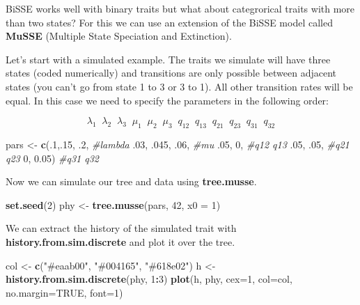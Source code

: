 \documentclass[
]{book}
\newenvironment{Shaded}{\begin{snugshade}}{\end{snugshade}}
\newcommand{\CommentTok}[1]{\textcolor[rgb]{0.56,0.35,0.01}{\textit{#1}}}
\newcommand{\DataTypeTok}[1]{\textcolor[rgb]{0.13,0.29,0.53}{#1}}
\newcommand{\DecValTok}[1]{\textcolor[rgb]{0.00,0.00,0.81}{#1}}
\newcommand{\FloatTok}[1]{\textcolor[rgb]{0.00,0.00,0.81}{#1}}
\newcommand{\KeywordTok}[1]{\textcolor[rgb]{0.13,0.29,0.53}{\textbf{#1}}}
\newcommand{\NormalTok}[1]{#1}
\newcommand{\OperatorTok}[1]{\textcolor[rgb]{0.81,0.36,0.00}{\textbf{#1}}}
\newcommand{\OtherTok}[1]{\textcolor[rgb]{0.56,0.35,0.01}{#1}}
\newcommand{\StringTok}[1]{\textcolor[rgb]{0.31,0.60,0.02}{#1}}
\begin{document}
BiSSE works well with binary traits but what about categrorical traits with more than two states? For this we can use an extension of the BiSSE model called \textbf{MuSSE} (Multiple State Speciation and Extinction).

Let's start with a simulated example. The traits we simulate will have three states (coded numerically) and transitions are only possible between adjacent states (you can't go from state 1 to 3 or 3 to 1). All other transition rates will be equal. In this case we need to specify the parameters in the following order:

\[\lambda_{1} \;\; \lambda_{2} \;\; \lambda_{3} \;\; \mu_{1} \;\; \mu_{2} \;\; \mu_{3} \;\; q_{12} \;\; q_{13} \;\; q_{21} \;\; q_{23} \;\; q_{31} \;\; q_{32}\]

\begin{Shaded}
\begin{Highlighting}[]
\NormalTok{pars \textless{}{-}}\StringTok{ }\KeywordTok{c}\NormalTok{(.}\DecValTok{1}\NormalTok{,.}\DecValTok{15}\NormalTok{, }\FloatTok{.2}\NormalTok{,       }\CommentTok{\#lambda}
          \FloatTok{.03}\NormalTok{, }\FloatTok{.045}\NormalTok{, }\FloatTok{.06}\NormalTok{,   }\CommentTok{\#mu}
          \FloatTok{.05}\NormalTok{, }\DecValTok{0}\NormalTok{,           }\CommentTok{\#q12 q13}
          \FloatTok{.05}\NormalTok{, }\FloatTok{.05}\NormalTok{,         }\CommentTok{\#q21 q23}
          \DecValTok{0}\NormalTok{, }\FloatTok{0.05}\NormalTok{)          }\CommentTok{\#q31 q32}
\end{Highlighting}
\end{Shaded}

Now we can simulate our tree and data using \textbf{tree.musse}.

\begin{Shaded}
\begin{Highlighting}[]
\KeywordTok{set.seed}\NormalTok{(}\DecValTok{2}\NormalTok{)}
\NormalTok{phy \textless{}{-}}\StringTok{ }\KeywordTok{tree.musse}\NormalTok{(pars, }\DecValTok{42}\NormalTok{, }\DataTypeTok{x0 =} \DecValTok{1}\NormalTok{)}
\end{Highlighting}
\end{Shaded}

We can extract the history of the simulated trait with \textbf{history.from.sim.discrete} and plot it over the tree.

\begin{Shaded}
\begin{Highlighting}[]
\NormalTok{col \textless{}{-}}\StringTok{ }\KeywordTok{c}\NormalTok{(}\StringTok{"\#eaab00"}\NormalTok{, }\StringTok{"\#004165"}\NormalTok{, }\StringTok{"\#618e02"}\NormalTok{)}
\NormalTok{h \textless{}{-}}\StringTok{ }\KeywordTok{history.from.sim.discrete}\NormalTok{(phy, }\DecValTok{1}\OperatorTok{:}\DecValTok{3}\NormalTok{)}
\KeywordTok{plot}\NormalTok{(h, phy, }\DataTypeTok{cex=}\DecValTok{1}\NormalTok{, }\DataTypeTok{col=}\NormalTok{col, }\DataTypeTok{no.margin=}\OtherTok{TRUE}\NormalTok{, }\DataTypeTok{font=}\DecValTok{1}\NormalTok{)}
\end{Highlighting}
\end{Shaded}
\end{document}

